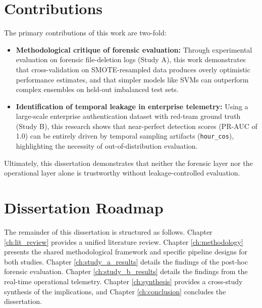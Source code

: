 \section{Contributions}
The primary contributions of this work are two-fold:
\begin{itemize}
    \item \textbf{Methodological critique of forensic evaluation:} Through experimental evaluation on forensic file-deletion logs (Study A), this work demonstrates that cross-validation on SMOTE-resampled data produces overly optimistic performance estimates, and that simpler models like SVMs can outperform complex ensembles on held-out imbalanced test sets.
    \item \textbf{Identification of temporal leakage in enterprise telemetry:} Using a large-scale enterprise authentication dataset with red-team ground truth (Study B), this research shows that near-perfect detection scores (PR-AUC of 1.0) can be entirely driven by temporal sampling artifacts (\texttt{hour\_cos}), highlighting the necessity of out-of-distribution evaluation.
\end{itemize}
Ultimately, this dissertation demonstrates that neither the forensic layer nor the operational layer alone is trustworthy without leakage-controlled evaluation.

\section{Dissertation Roadmap}
The remainder of this dissertation is structured as follows. Chapter \ref{ch:lit_review} provides a unified literature review. Chapter \ref{ch:methodology} presents the shared methodological framework and specific pipeline designs for both studies. Chapter \ref{ch:study_a_results} details the findings of the post-hoc forensic evaluation. Chapter \ref{ch:study_b_results} details the findings from the real-time operational telemetry. Chapter \ref{ch:synthesis} provides a cross-study synthesis of the implications, and Chapter \ref{ch:conclusion} concludes the dissertation.
